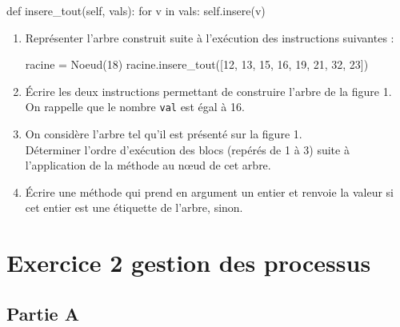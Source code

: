 \documentclass[a4paper,12pt,french]{book}
\begin{document}
\begin{enumerate}[\bfseries 1.]
\begin{pythoncode}
    def insere_tout(self, vals):
        for v in vals:
            self.insere(v)
\end{pythoncode}

\begin{enumerate}[\bfseries a.]
	\item Représenter l'arbre construit suite à l'exécution des instructions suivantes :
    \begin{pythoncode}
racine = Noeud(18)
racine.insere_tout([12, 13, 15, 16, 19, 21, 32, 23])
    \end{pythoncode}
    \newpage
    \item \'Ecrire les deux instructions permettant de construire l’arbre de la figure 1. On rappelle que le nombre \texttt{val} est égal à 16.

    \item  On considère l’arbre tel qu’il est présenté sur la figure 1.\\
    Déterminer l’ordre d’exécution des blocs (repérés de 1 à 3) suite à l’application de la méthode  au nœud  de cet arbre.
    \item \'Ecrire une méthode  qui prend en argument un entier  et renvoie la valeur  si cet entier est une étiquette de l’arbre,  sinon.
\end{enumerate}
\end{enumerate}


\section*{Exercice 2 \small{\hfill gestion des processus}}

\subsection*{Partie A}
\end{document}
